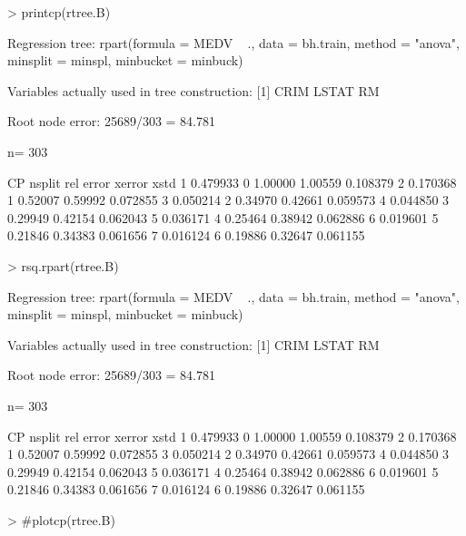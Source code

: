 \documentclass{article}
\begin{document}
\begin{Schunk}
\begin{Sinput}
> printcp(rtree.B)
\end{Sinput}
\begin{Soutput}
Regression tree:
rpart(formula = MEDV ~ ., data = bh.train, method = "anova", 
    minsplit = minspl, minbucket = minbuck)

Variables actually used in tree construction:
[1] CRIM  LSTAT RM   

Root node error: 25689/303 = 84.781

n= 303 

        CP nsplit rel error  xerror     xstd
1 0.479933      0   1.00000 1.00559 0.108379
2 0.170368      1   0.52007 0.59992 0.072855
3 0.050214      2   0.34970 0.42661 0.059573
4 0.044850      3   0.29949 0.42154 0.062043
5 0.036171      4   0.25464 0.38942 0.062886
6 0.019601      5   0.21846 0.34383 0.061656
7 0.016124      6   0.19886 0.32647 0.061155
\end{Soutput}
\begin{Sinput}
> rsq.rpart(rtree.B)
\end{Sinput}
\begin{Soutput}
Regression tree:
rpart(formula = MEDV ~ ., data = bh.train, method = "anova", 
    minsplit = minspl, minbucket = minbuck)

Variables actually used in tree construction:
[1] CRIM  LSTAT RM   

Root node error: 25689/303 = 84.781

n= 303 

        CP nsplit rel error  xerror     xstd
1 0.479933      0   1.00000 1.00559 0.108379
2 0.170368      1   0.52007 0.59992 0.072855
3 0.050214      2   0.34970 0.42661 0.059573
4 0.044850      3   0.29949 0.42154 0.062043
5 0.036171      4   0.25464 0.38942 0.062886
6 0.019601      5   0.21846 0.34383 0.061656
7 0.016124      6   0.19886 0.32647 0.061155
\end{Soutput}
\begin{Sinput}
> #plotcp(rtree.B)
\end{Sinput}
\end{Schunk}
\end{document}
